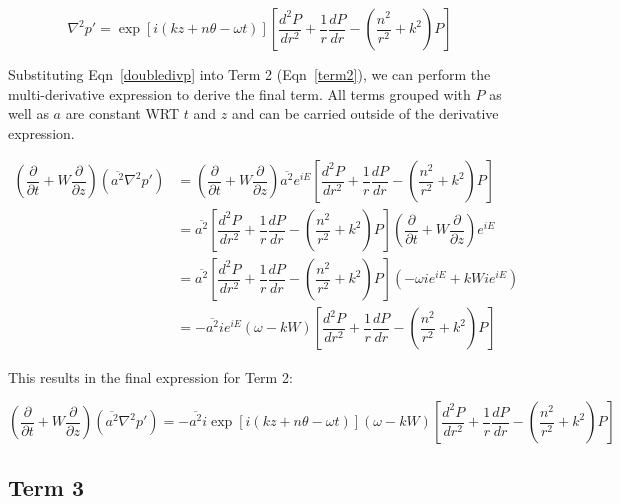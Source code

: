 \documentclass[]{aiaa-tc}%
\begin{document}
\begin{equation} \label{doubledivp}
\boxed{ \nabla^2p'= \exp[i(kz + n\theta -\omega t)] \left[
      \dfrac{d^2P}{dr^2}
    + \dfrac{1}{r} \dfrac{dP}{dr}
    - \left( \dfrac{n^2}{r^2} + k^2 \right) P \right] }
\end{equation}

Substituting Eqn~\ref{doubledivp} into Term 2 (Eqn~\ref{term2}), we can perform the multi-derivative expression to derive the final term.  All terms grouped with $P$ as well as $a$ are constant WRT $t$ and $z$ and can be carried outside of the derivative expression.

\begin{align*}
\left( \dfrac{\partial}{\partial t}
  + W \dfrac{\partial}{\partial z} \right)
  (\overline{a^2}\nabla^2p')
&= \left( \dfrac{\partial}{\partial t}
  + W \dfrac{\partial}{\partial z}
  \right) \overline{a^2} e^{iE} \left[
      \dfrac{d^2P}{dr^2}
    + \dfrac{1}{r} \dfrac{dP}{dr}
    - \left( \dfrac{n^2}{r^2} + k^2 \right) P \right] \\
&= \overline{a^2} \left[ \dfrac{d^2P}{dr^2}
          + \dfrac{1}{r} \dfrac{dP}{dr}
          - \left( \dfrac{n^2}{r^2} + k^2 \right) P \right]
    \left( \dfrac{\partial}{\partial t}
  + W \dfrac{\partial}{\partial z}
  \right) e^{iE} \\
&= \overline{a^2} \left[ \dfrac{d^2P}{dr^2}
          + \dfrac{1}{r} \dfrac{dP}{dr}
          - \left( \dfrac{n^2}{r^2} + k^2 \right) P \right]
  \left( -\omega ie^{iE} + kW ie^{iE}\right) \\
&= - \overline{a^2} ie^{iE} (\omega - kW) \left[ \dfrac{d^2P}{dr^2}
          + \dfrac{1}{r} \dfrac{dP}{dr}
          - \left( \dfrac{n^2}{r^2} + k^2 \right) P \right]
\end{align*}

This results in the final expression for Term 2:

\begin{equation} \label{term2soln}
\boxed{ \left( \dfrac{\partial}{\partial t}
  + W \dfrac{\partial}{\partial z} \right)
  (\overline{a^2}\nabla^2p')
= - \overline{a^2} i\exp[i(kz + n\theta -\omega t)]
    (\omega - kW) \left[ \dfrac{d^2P}{dr^2}
    + \dfrac{1}{r} \dfrac{dP}{dr}
    - \left( \dfrac{n^2}{r^2} + k^2 \right) P \right] }
\end{equation}





\clearpage
\subsection{Term 3}
\end{document}
